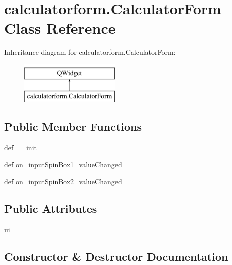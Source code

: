 \hypertarget{classcalculatorform_1_1CalculatorForm}{}\section{calculatorform.\+Calculator\+Form Class Reference}
\label{classcalculatorform_1_1CalculatorForm}
Inheritance diagram for calculatorform.\+Calculator\+Form\+:\begin{figure}[H]
\begin{center}
\leavevmode
\includegraphics[height=2.000000cm]{classcalculatorform_1_1CalculatorForm}
\end{center}
\end{figure}
\subsection*{Public Member Functions}
\begin{DoxyCompactItemize}
\item 
def \hyperlink{classcalculatorform_1_1CalculatorForm_af4076d92b6ee9bbc9a160b867ca7d370}{\+\_\+\+\_\+init\+\_\+\+\_\+}
\item 
def \hyperlink{classcalculatorform_1_1CalculatorForm_a49b752c65c3f8c05db7dfe6b630980bd}{on\+\_\+input\+Spin\+Box1\+\_\+value\+Changed}
\item 
def \hyperlink{classcalculatorform_1_1CalculatorForm_a90f0ce572e35e7800b568a1acc1e17c3}{on\+\_\+input\+Spin\+Box2\+\_\+value\+Changed}
\end{DoxyCompactItemize}
\subsection*{Public Attributes}
\begin{DoxyCompactItemize}
\item 
\hyperlink{classcalculatorform_1_1CalculatorForm_a5d869fbdc8952181edafe04c0488b6b0}{ui}
\end{DoxyCompactItemize}


\subsection{Constructor \& Destructor Documentation}
\hypertarget{classcalculatorform_1_1CalculatorForm_af4076d92b6ee9bbc9a160b867ca7d370}{}
